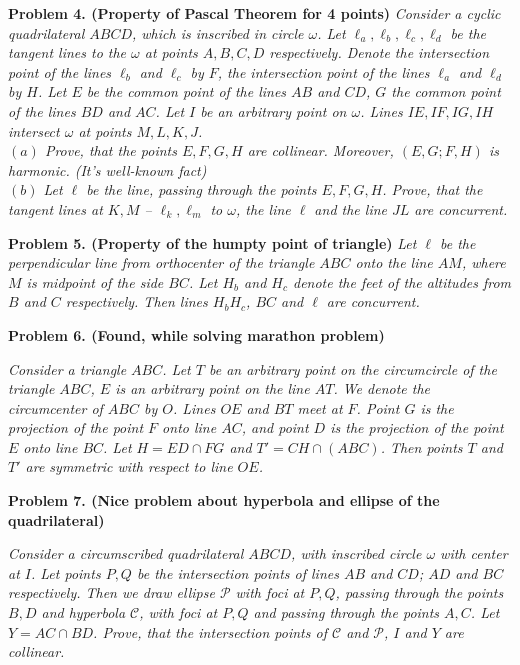 \documentclass[12pt]{extarticle}
\begin{document}
\textbf{Problem 4. (Property of Pascal Theorem for 4 points)}
\textit{
Consider a cyclic quadrilateral \(ABCD\), which is inscribed in circle 
\(\omega\). Let \(\ell_a, \ell_b, \ell_c, \ell_d\) be the tangent 
lines to the \(\omega\) at points \(A,B,C,D\) respectively. 
Denote the intersection point of the lines \(\ell_b\) and \(\ell_c\) 
by \(F\), the intersection point of the lines \(\ell_a\) and \(\ell_d\) 
by \(H\). Let \(E\) be the common point of the lines \(AB\) and 
\(CD\), \(G\) the common point of the lines \(BD\) and \(AC\). 
Let \(I\) be an arbitrary point on \(\omega\). Lines \(IE, IF, IG, IH\) 
intersect \(\omega\) at points \(M,L,K,J\).\\
\((a)\) Prove, that the points \(E,F,G,H\) are collinear. Moreover, 
\((E,G;F,H)\) is harmonic. (It's well-known fact) \\
\((b)\) Let \(\ell\) be the line, passing through the points \(E,F,G,H\). 
Prove, that the tangent lines at \(K,M\) -- \(\ell_k, \ell_m\) 
to \(\omega\), the line \(\ell\) and the line \(JL\) are concurrent.\\
}


\textbf{Problem 5. (Property of the humpty point of triangle)}
\textit{
Let \(\ell\) be the perpendicular line from orthocenter of the triangle 
\(ABC\) onto the line \(AM\), where \(M\) is midpoint of the side \(BC\).
Let \(H_b\) and \(H_c\) denote the feet of the altitudes from \(B\) and 
\(C\) respectively. Then lines \(H_bH_c\), \(BC\) and \(\ell\) are 
concurrent.
}

\textbf{Problem 6. (Found, while solving marathon problem)}

\textit{Consider a triangle \(ABC\). Let \(T\) be an arbitrary
point on the circumcircle of the triangle \(ABC\), \(E\) is an
arbitrary point on the line \(AT\). We denote the circumcenter of
\(ABC\) by \(O\). Lines \(OE\) and \(BT\) meet at \(F\). Point \(G\)
is the projection of the point \(F\) onto line \(AC\), and point \(D\)
is the projection of the point \(E\) onto line \(BC\). Let \(H = ED \cap
FG\) and \(T' = CH \cap (ABC)\). Then points \(T\) and \(T'\) are
symmetric with respect to line \(OE\).}


\textbf{Problem 7. (Nice problem about hyperbola and ellipse of the
quadrilateral)}

\textit{Consider a circumscribed quadrilateral \(ABCD\), with
inscribed circle \(\omega\) with center at \(I\). Let points \(P,Q\)
be the intersection points of lines \(AB\) and \(CD\); \(AD\) and
\(BC\) respectively. Then we draw ellipse \(\mathcal{P}\) with foci at
\(P,Q\), passing through the points \(B, D\) and hyperbola
\(\mathcal{C}\), with foci at \(P,Q\) and passing through the points
\(A, C\). Let \(Y = AC \cap BD\). Prove, that the intersection points
of \(\mathcal{C}\) and \(\mathcal{P}\), \(I\) and \(Y\) are collinear.}
\end{document}
